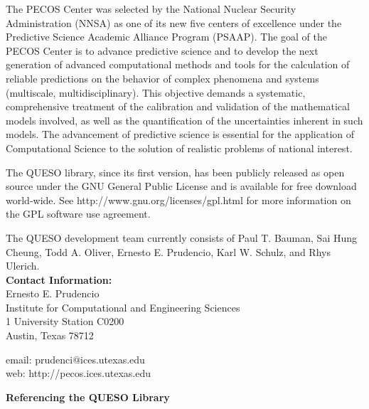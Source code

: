 The PECOS Center was selected by the National Nuclear Security Administration (NNSA) as one of its new five centers of excellence
under the Predictive Science Academic Alliance Program (PSAAP).
The goal of the PECOS Center is
to advance predictive science and to develop the next generation of advanced computational methods and tools
for the calculation of reliable predictions on the behavior of complex phenomena and systems (multiscale, multidisciplinary).
This objective demands a systematic, comprehensive treatment of the calibration and validation of the mathematical models involved,
as well as the quantification of the uncertainties inherent in such models.
The advancement of predictive science is essential for the application of Computational Science to the solution of realistic problems of national interest.

The QUESO library, since its first version, has been publicly released as open source
under the GNU General Public License and is available for free download world-wide.
See http://www.gnu.org/licenses/gpl.html for more information on the GPL software use agreement.

The QUESO development team currently consists of
Paul T. Bauman,
Sai Hung Cheung,
Todd A. Oliver,
Ernesto E. Prudencio,
Karl W. Schulz, and
Rhys Ulerich.\\

{\bf Contact Information:}\\
Ernesto E. Prudencio\\
Institute for Computational and Engineering Sciences\\
1 University Station C0200\\
Austin, Texas 78712

email: prudenci@ices.utexas.edu\\
web: http://pecos.ices.utexas.edu\\
$~$\\

\centerline{\bf Referencing the QUESO Library}

